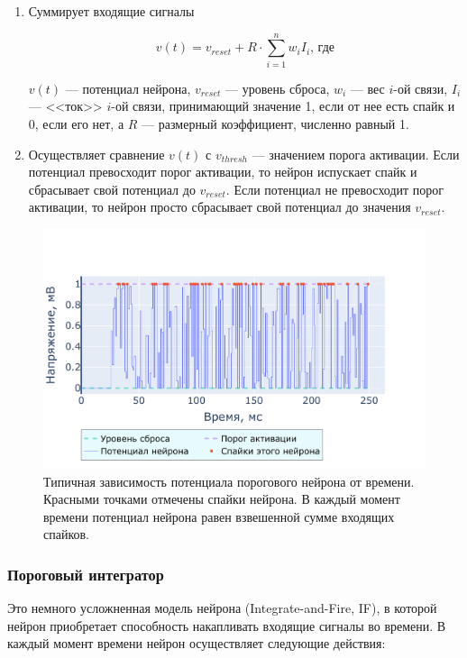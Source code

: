 \documentclass[a4paper]{article}
\begin{document}
\begin{enumerate}
 \item Суммирует входящие сигналы

\begin{equation} \label{eq:thresh}
v(t) = v_{reset} + R \cdot \sum_{i=1}^n {w_i I_i} \text{, где}
\end{equation}

$v(t)$ --- потенциал нейрона, $v_{reset}$ --- уровень сброса, $w_i$ --- вес $i$-ой связи, $I_i$ --- <<ток>> $i$-ой связи, принимающий значение 1, если от нее есть спайк и 0, если его нет, а $R$ --- размерный коэффициент, численно равный 1.

\item Осуществляет сравнение $v(t)$ с $v_{thresh}$ --- значением порога активации. Если потенциал превосходит порог активации, то нейрон испускает спайк и сбрасывает свой потенциал до $v_{reset}$. Если потенциал не превосходит порог активации, то нейрон просто сбрасывает свой потенциал до значения $v_{reset}$.
\end{enumerate}

\begin{center}
\begin{figure}[H] 
 \includegraphics[width=\textwidth,keepaspectratio=true]{model_thresh_ru.pdf}
 \caption{Типичная зависимость потенциала порогового нейрона от времени. Красными точками отмечены спайки нейрона. В каждый момент времени потенциал нейрона равен взвешенной сумме входящих спайков.}
\end{figure}
\end{center}

\subsubsection{Пороговый интегратор}
Это немного усложненная модель нейрона (Integrate-and-Fire, IF), в которой нейрон приобретает способность накапливать входящие сигналы во времени. В каждый момент времени нейрон осуществляет следующие действия:
\end{document}
